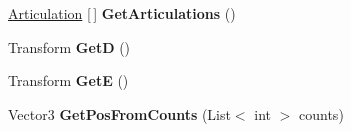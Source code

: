\begin{DoxyCompactItemize}
\item 
\mbox{\label{class_i_k_ae8f0fe38cdc7d2280fc4c9343176810a}} 
\mbox{\hyperlink{class_articulation}{Articulation}} \mbox{[}$\,$\mbox{]} {\bfseries Get\+Articulations} ()
\item 
\mbox{\label{class_i_k_aa7d322903f3e24412e87ec8b8f9281a0}} 
Transform {\bfseries GetD} ()
\item 
\mbox{\label{class_i_k_a706f81d48d5c7d00791a78b8d09e923e}} 
Transform {\bfseries GetE} ()
\item 
\mbox{\label{class_i_k_a265ad7e93d155fb6183a60baa8d97b4d}} 
Vector3 {\bfseries Get\+Pos\+From\+Counts} (List$<$ int $>$ counts)
\end{DoxyCompactItemize}

